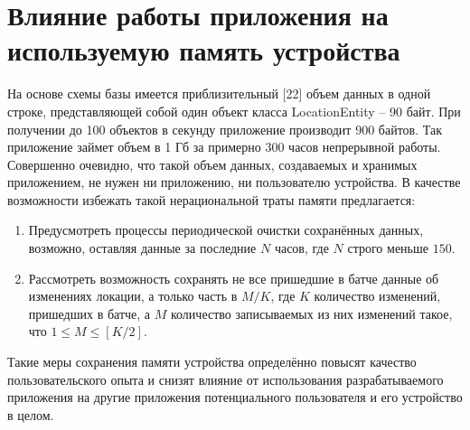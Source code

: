 \section{Влияние работы приложения на используемую память устройства}
На основе схемы базы имеется приблизительный [22] объем данных в одной строке, представляющей собой один объект класса LocationEntity – 90 байт. При получении до 100 объектов в секунду приложение производит 900 байтов. Так приложение займет объем в 1 Гб за примерно 300 часов непрерывной работы. Совершенно очевидно, что такой объем данных, создаваемых и хранимых приложением, не нужен ни приложению, ни пользователю устройства. 
В качестве возможности избежать такой нерациональной траты памяти предлагается:
\begin{enumerate}
	\item Предусмотреть процессы периодической очистки сохранённых данных, возможно, оставляя данные за последние $N$ часов, где $N$ строго меньше $150$.
	\item Рассмотреть возможность сохранять не все пришедшие в батче данные об изменениях локации, а только часть в $M/K$, где $K$ \textemdash\space количество изменений, пришедших в батче, а $M$ \textemdash\space количество записываемых из них изменений такое, что $1 \le M \le [K/2]$.
\end{enumerate}
Такие меры сохранения памяти устройства определённо повысят качество пользовательского опыта и снизят влияние от использования разрабатываемого приложения на другие приложения потенциального пользователя и его устройство в целом.
